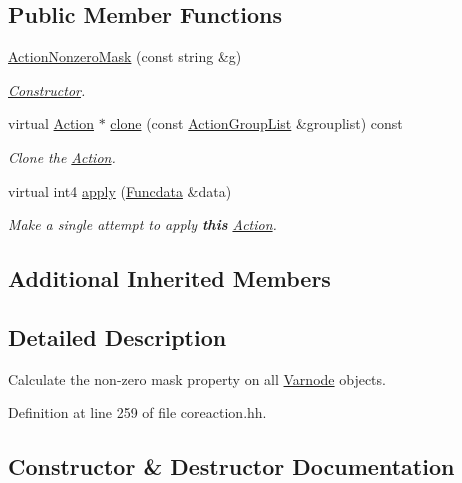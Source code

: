 \subsection*{Public Member Functions}
\begin{DoxyCompactItemize}
\item 
\mbox{\hyperlink{class_action_nonzero_mask_ab206a03a946f6e7e138c5e057154c569}{Action\+Nonzero\+Mask}} (const string \&g)
\begin{DoxyCompactList}\small\item\em \mbox{\hyperlink{class_constructor}{Constructor}}. \end{DoxyCompactList}\item 
virtual \mbox{\hyperlink{class_action}{Action}} $\ast$ \mbox{\hyperlink{class_action_nonzero_mask_aee9f54ce67eaa18b65d667304dfd2124}{clone}} (const \mbox{\hyperlink{class_action_group_list}{Action\+Group\+List}} \&grouplist) const
\begin{DoxyCompactList}\small\item\em Clone the \mbox{\hyperlink{class_action}{Action}}. \end{DoxyCompactList}\item 
virtual int4 \mbox{\hyperlink{class_action_nonzero_mask_a585181ff1ba9a3ce19de0c9e939ac381}{apply}} (\mbox{\hyperlink{class_funcdata}{Funcdata}} \&data)
\begin{DoxyCompactList}\small\item\em Make a single attempt to apply {\bfseries{this}} \mbox{\hyperlink{class_action}{Action}}. \end{DoxyCompactList}\end{DoxyCompactItemize}
\subsection*{Additional Inherited Members}


\subsection{Detailed Description}
Calculate the non-\/zero mask property on all \mbox{\hyperlink{class_varnode}{Varnode}} objects. 

Definition at line 259 of file coreaction.\+hh.



\subsection{Constructor \& Destructor Documentation}
\mbox{\label{class_action_nonzero_mask_ab206a03a946f6e7e138c5e057154c569}} 
